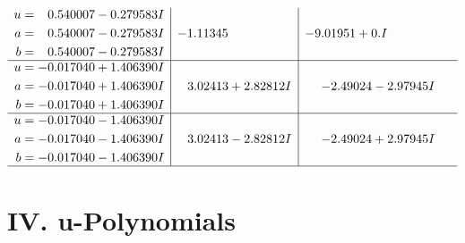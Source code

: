 \documentclass[1p]{elsarticle_modified}
\theoremstyle{definition}
\begin{document}
$$\begin{array}{c|c|c}
\begin{aligned}
u &= \phantom{-}0.540007 - 0.279583 I \\
a &= \phantom{-}0.540007 - 0.279583 I \\
b &= \phantom{-}0.540007 - 0.279583 I\end{aligned}
 & -1.11345\phantom{ +0.000000I} & -9.01951 + 0. I\phantom{ +0.000000I} \\ \hline\begin{aligned}
u &= -0.017040 + 1.406390 I \\
a &= -0.017040 + 1.406390 I \\
b &= -0.017040 + 1.406390 I\end{aligned}
 & \phantom{-}3.02413 + 2.82812 I & -2.49024 - 2.97945 I \\ \hline\begin{aligned}
u &= -0.017040 - 1.406390 I \\
a &= -0.017040 - 1.406390 I \\
b &= -0.017040 - 1.406390 I\end{aligned}
 & \phantom{-}3.02413 - 2.82812 I & -2.49024 + 2.97945 I\\
 \hline 
 \end{array}$$\newpage
\newpage\renewcommand{\arraystretch}{1}
\centering \section*{ IV. u-Polynomials}
\end{document}
